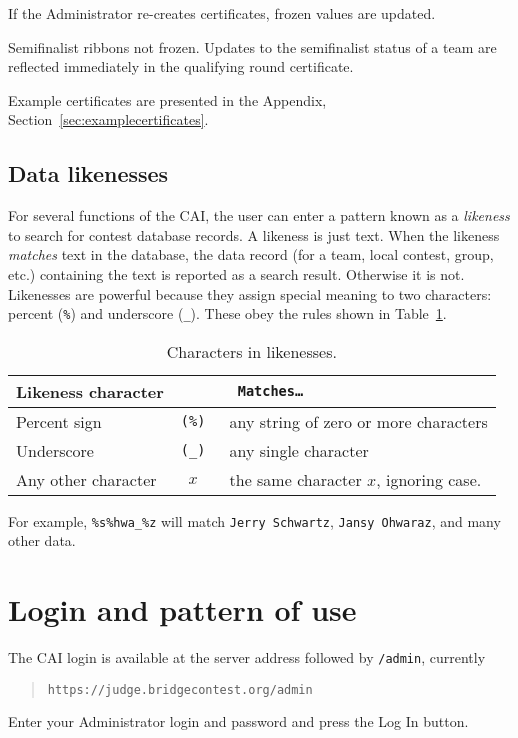 \documentclass[11pt,letterpaper]{refart}
\def\nada{\hspace{0pt}}
\def\ui#1{\textsf{#1}}
\begin{document}
If the Administrator re-creates certificates, frozen values are
updated.

Semifinalist ribbons not frozen. Updates to the semifinalist status of
a team are reflected immediately in the qualifying round certificate.

Example certificates are presented in the Appendix,
Section~\ref{sec:examplecertificates}.

\subsection{Data likenesses}
For several functions of the CAI, the user can enter a pattern known
as a \emph{likeness} to search for contest database records. A
likeness is just text. When the likeness \emph{matches} text in
the database, the data record (for a team, local contest, group, etc.)
containing the text is reported as a search result. Otherwise it is
not. Likenesses are powerful because they assign special meaning to
two characters: percent (\texttt{\%}) and underscore
(\texttt{\_}). These obey the rules shown in
Table~\ref{tbl:likeness}.\
\begin{table}
\centering
\caption{Characters in likenesses.}
\begin{tabular}{l>{\tt}cl}
\multicolumn{2}{l}{\bfseries Likeness character} & {\bfseries Matches\ldots} \\ \hline
Percent sign & (\texttt{\%}\nada) & any string of zero or more characters \\
Underscore  & (\texttt{\_}\nada)  & any single character \\
Any other character & $x$ & the same character $x$, ignoring case.
\end{tabular}
\label{tbl:likeness}
\end{table}

For example, \texttt{\%s\%hwa\_\%z} will match \texttt{Jerry Schwartz}, 
\texttt{Jansy Ohwaraz}, and many other data.

\section{Login and pattern of use}
The CAI login is available at the server address followed by
\texttt{/admin}, currently
\begin{quote} 
\texttt{https://judge.bridgecontest.org/admin}
\end{quote}
Enter your Administrator login and password and press the \ui{Log In} button.
\end{document}
